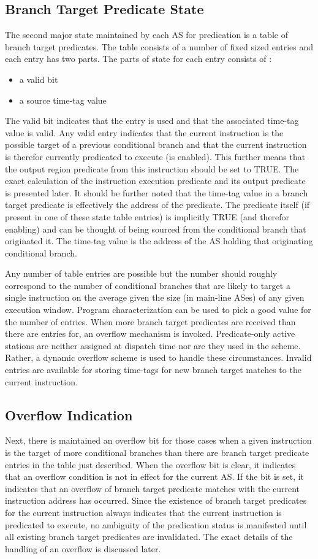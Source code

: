 \documentclass[10pt,dvips]{article}
\begin{document}
\subsection{Branch Target Predicate State}
%
The second major state maintained by each AS for predication
is a table of branch target predicates.
The table consists of a number of fixed sized entries and
each entry has two parts.
The parts of state for each entry consists of :
%
\begin{itemize}
\item{a valid bit}
\item{a source time-tag value}
\end{itemize}   
%
The valid bit indicates that the entry is used and that
the associated time-tag value is valid.  Any valid entry
indicates that the current instruction is the possible target
of a previous conditional branch and that the current instruction
is therefor currently predicated
to execute (is enabled).  This further means that the output 
region predicate from this instruction should
be set to TRUE.  The exact calculation of the instruction
execution predicate and its output predicate is presented later.
It should be further noted that the time-tag value in a
branch target predicate is effectively the address of the predicate.
The predicate itself (if present in one of these state table entries)
is implicitly TRUE (and therefor enabling) and can be thought of
being sourced from the conditional branch that originated it.
The time-tag value is the address of the AS holding that 
originating conditional branch.

Any number of table entries are possible but the number should
roughly correspond to the number of conditional branches that
are likely to target a single instruction on the average given
the size (in main-line ASes) of any given execution window.
Program characterization can be used to pick a good value for the
number of entries.  When more branch target predicates
are received than there are entries for, an overflow mechanism
is invoked.  Predicate-only active stations are neither assigned
at dispatch time nor are they used in the scheme.
Rather, a dynamic overflow scheme is used to handle these circumstances.
Invalid entries are available for storing
time-tags for new branch target matches to the current instruction.
%
\subsection{Overflow Indication}
%
Next, there is maintained an overflow bit 
for those cases when a given instruction is the
target of more conditional branches than there are branch target
predicate entries in the table just described.
When the overflow bit is clear, it indicates that an overflow
condition is not in effect for the current AS.
If the bit is set, it indicates that an overflow of
branch target predicate matches with the current instruction
address has occurred.  
Since the existence of branch target predicates 
for the current instruction
always indicates
that the current instruction is predicated to execute, no
ambiguity of the predication status is manifested until all existing
branch target predicates are invalidated.
The exact details of the handling of an overflow is discussed later.
%
\end{document}
